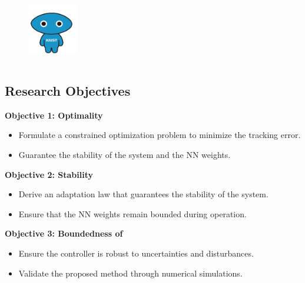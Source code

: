 \documentclass[8pt, aspectratio=169]{beamer}
\begin{document}
\begin{frame}{\insertsubsectionhead}
\begin{enumerate}
\begin{columns}[T,onlytextwidth]
          \begin{figure}
            \includegraphics[width=0.4\textwidth]{figures/KAIST-hi.png}
          \end{figure}
      \end{columns}
  \end{enumerate}
\end{frame}

\subsection{Research Objectives}

\begin{frame}{\insertsubsectionhead}

  \textbf{Objective 1: Optimality}
  \begin{itemize}
    \item Formulate a constrained optimization problem to minimize the tracking error.
    \item Guarantee the stability of the system and the NN weights.
  \end{itemize}

  \textbf{Objective 2: Stability}
  \begin{itemize}
    \item Derive an adaptation law that guarantees the stability of the system.
    \item Ensure that the NN weights remain bounded during operation.
  \end{itemize}

  \textbf{Objective 3: Boundedness of }
  \begin{itemize}
    \item Ensure the controller is robust to uncertainties and disturbances.
    \item Validate the proposed method through numerical simulations.
  \end{itemize}

\end{frame}
\end{document}
